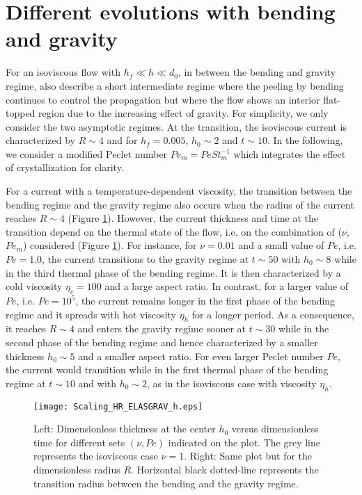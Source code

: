 \section{Different evolutions with bending and gravity}
\label{C3-sec:diff-evol-with-1}

For an isoviscous flow with $h_f \ll  h  \ll  d_0$, in between the bending
and  gravity  regime,  \citet{Lister:2013ia}  also  describe  a  short
intermediate regime where the peeling  by bending continues to control
the  propagation but  where  the flow  shows  an interior  flat-topped
region due  to the  increasing effect of  gravity. For  simplicity, we
only  consider the  two asymptotic  regimes.  At  the transition,  the
isoviscous current  is characterized by $R\sim4$  and for $h_f=0.005$,
$h_0 \sim 2$ and $t \sim 10$. In the following, we consider a modified
Peclet number  $Pe_m =  Pe St_m^{-1}$ which  integrates the  effect of
crystallization for clarity.

For a  current with a temperature-dependent  viscosity, the transition
between the bending regime and the gravity regime also occurs when the
radius    of     the    current    reaches    $R\sim     4$    (Figure
\ref{C3-Scaling_HR_ELASGRAV_h}).  However,  the current  thickness and
time at the  transition depend on the thermal state  of the flow, i.e.
on    the   combination    of   ($\nu$,$Pe_m$)    considered   (Figure
\ref{C3-Scaling_HR_ELASGRAV_h}).  For  instance, for $\nu=0.01$  and a
small value of $Pe$, i.e.  $Pe  = 1.0$, the current transitions to the
gravity regime  at $t \sim  50$ with $h_0 \sim  8$ while in  the third
thermal phase  of the bending  regime. It  is then characterized  by a
cold viscosity  $\eta_c=100$ and a  large aspect ratio.   In contrast,
for a  larger value  of $Pe$,  i.e.  $Pe=  10^5$, the  current remains
longer in  the first phase of  the bending regime and  it spreads with
hot  viscosity $\eta_h$  for a  longer period.   As a  consequence, it
reaches $R \sim 4$ and enters  the gravity regime sooner at $t\sim 30$
while  in   the  second  phase   of  the  bending  regime   and  hence
characterized by a smaller thickness  $h_0\sim 5$ and a smaller aspect
ratio.   For  even  larger  Peclet  number  $Pe$,  the  current  would
transition while in  the first thermal phase of the  bending regime at
$t \sim  10$ and  with $h_0 \sim  2$, as in  the isoviscous  case with
viscosity $\eta_h$.

\begin{figure}[h!]
  \begin{center}
    \graphicspath{ {/Users/thorey/Documents/These/Projet/Refroidissement/Skin_Model/Figure/JFM_V13/} }
    \texttt{[image: Scaling\_HR\_ELASGRAV\_h.eps]}
    \caption{Left: Dimensionless thickness at  the center $h_0$ versus
      dimensionless time  for different  sets $(\nu,Pe)$  indicated on
      the plot.  The grey line represents the isoviscous case $\nu=1$.
      Right:  Same   plot  but  for  the   dimensionless  radius  $R$.
      Horizontal  black dotted-line  represents the  transition radius
      between the bending and the gravity regime.}
    \label{C3-Scaling_HR_ELASGRAV_h}
  \end{center}
\end{figure}

